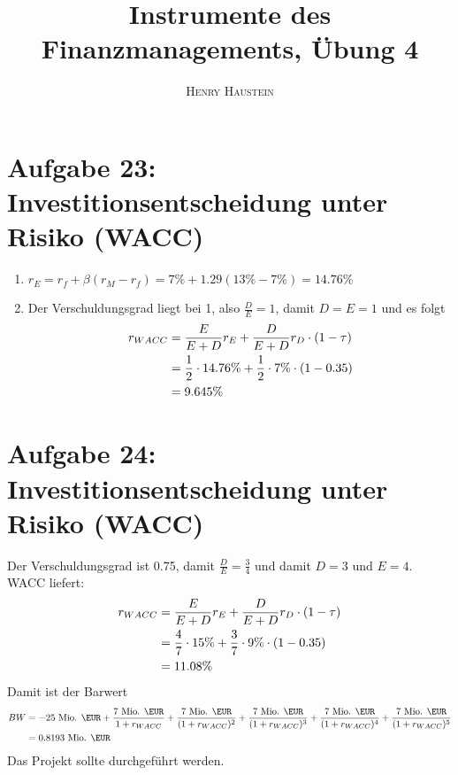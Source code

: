 \documentclass{article}
\title{\textbf{Instrumente des Finanzmanagements, Übung 4}}
\author{\textsc{Henry Haustein}}
\date{}
\begin{document}
	\maketitle

	\section*{Aufgabe 23: Investitionsentscheidung unter Risiko (WACC)}
	\begin{enumerate}[label=(\alph*)]
		\item $r_E=r_f+\beta(r_M-r_f) = 7\% + 1.29(13\% - 7\%) = 14.76\%$
		\item Der Verschuldungsgrad liegt bei 1, also $\frac{D}{E}=1$, damit $D=E=1$ und es folgt
		\begin{align}
			r_{WACC} &= \frac{E}{E+D}r_E + \frac{D}{E+D}r_D\cdot (1-\tau) \notag \\
			&= \frac{1}{2}\cdot 14.76\% + \frac{1}{2}\cdot 7\%\cdot (1-0.35) \notag \\
			&= 9.645\%\notag
		\end{align}
	\end{enumerate}
	
	\section*{Aufgabe 24: Investitionsentscheidung unter Risiko (WACC)}
	Der Verschuldungsgrad ist 0.75, damit $\frac{D}{E}=\frac{3}{4}$ und damit $D=3$ und $E=4$. WACC liefert:
	\begin{align}
		r_{WACC} &= \frac{E}{E+D}r_E + \frac{D}{E+D}r_D\cdot (1-\tau) \notag \\
		&= \frac{4}{7}\cdot 15\% + \frac{3}{7}\cdot 9\%\cdot (1-0.35) \notag \\
		&= 11.08\%\notag
	\end{align}
	Damit ist der Barwert
	\begin{align}
		BW &= -25\text{ Mio. \EUR} + \frac{7\text{ Mio. \EUR}}{1+r_{WACC}} + \frac{7\text{ Mio. \EUR}}{(1+r_{WACC})^2} + \frac{7\text{ Mio. \EUR}}{(1+r_{WACC})^3} + \frac{7\text{ Mio. \EUR}}{(1+r_{WACC})^4} + \frac{7\text{ Mio. \EUR}}{(1+r_{WACC})^5} \notag \\
		&= 0.8193\text{ Mio. \EUR} \notag
	\end{align}
	Das Projekt sollte durchgeführt werden.
\end{document}
